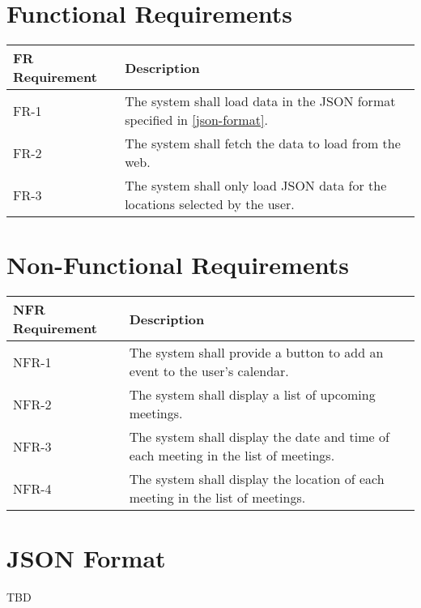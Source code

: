 \documentclass{article}
\newcommand{\requirement}[1]{The system shall #1.}
\begin{document}
\section{Functional Requirements}
\begin{tabu}{lX}
  \toprule
  FR Requirement & Description\\
  \midrule
  FR-1 & \requirement{load data in the JSON format specified in
    \vref{json-format}}\\
  FR-2 & \requirement{fetch the data to load from the web}\\
  FR-3 & \requirement{only load JSON data for the locations selected
    by the user}\\
  \bottomrule
\end{tabu}
\section{Non-Functional Requirements}
\begin{tabu}{lX}
  \toprule
  NFR Requirement & Description\\
  \midrule
  NFR-1 & \requirement{provide a button to add an event to the user's
    calendar}\\
  NFR-2 & \requirement{display a list of upcoming meetings}\\
  NFR-3 & \requirement{display the date and time of each meeting in
    the list of meetings}\\
  NFR-4 & \requirement{display the location of each meeting in the
    list of meetings}\\
  \bottomrule
\end{tabu}

\section{JSON Format}
\label{json-format}
TBD
\end{document}

